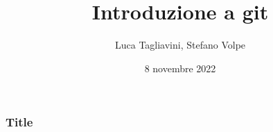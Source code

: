 \documentclass{beamer}
\title{Introduzione a git}
\author{Luca Tagliavini, Stefano Volpe}
\institute{Università di Bologna, corso di Laurea in Informatica}
\date{8 novembre 2022}
\begin{document}
\frame{\titlepage}

\begin{frame}
\frametitle{Title}
\end{frame}
\end{document}

